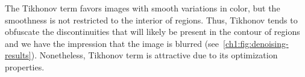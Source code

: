 The Tikhonov term favors images with smooth variations in color, but the smoothness is not restricted to the interior of regions. Thus, Tikhonov tends to obfuscate the discontinuities that will likely be present in the contour of regions and we have the impression that the image is blurred (see~\cref{ch1:fig:denoising-results}). Nonetheless, Tikhonov term is attractive due to its optimization properties.

\begin{figure}
\center
%
\end{figure}
